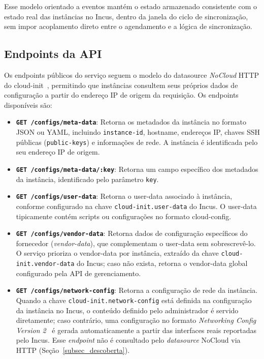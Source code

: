 Esse modelo orientado a eventos mantém o estado armazenado consistente com o estado real das instâncias no Incus, dentro da janela do ciclo de sincronização, sem impor acoplamento direto entre o agendamento e a lógica de sincronização.

\subsection{Endpoints da API}
\label{subsec_endpoints}

Os endpoints públicos do serviço seguem o modelo do datasource \textit{NoCloud} HTTP do cloud-init~\citep{cloudinit_nocloud}, permitindo que instâncias consultem seus próprios dados de configuração a partir do endereço IP de origem da requisição. Os endpoints disponíveis são:

\begin{itemize}
    \item \textbf{\texttt{GET /configs/meta-data}}: Retorna os metadados da instância no formato JSON ou YAML, incluindo \texttt{instance-id}, hostname, endereços IP, chaves SSH públicas (\texttt{public-keys}) e informações de rede. A instância é identificada pelo seu endereço IP de origem.

    \item \textbf{\texttt{GET /configs/meta-data/:key}}: Retorna um campo específico dos metadados da instância, identificado pelo parâmetro \texttt{key}.

    \item \textbf{\texttt{GET /configs/user-data}}: Retorna o user-data associado à instância, conforme configurado na chave \texttt{cloud-init.user-data} do Incus. O user-data tipicamente contém scripts ou configurações no formato cloud-config.

    \item \textbf{\texttt{GET /configs/vendor-data}}: Retorna dados de configuração específicos do fornecedor (\textit{vendor-data}), que complementam o user-data sem sobrescrevê-lo. O serviço prioriza o vendor-data por instância, extraído da chave \texttt{cloud-init.vendor-data} do Incus; caso não exista, retorna o vendor-data global configurado pela API de gerenciamento.

    \item \textbf{\texttt{GET /configs/network-config}}: Retorna a configuração de rede da instância. Quando a chave \texttt{cloud-init.network-config} está definida na configuração da instância no Incus, o conteúdo definido pelo administrador é servido diretamente; caso contrário, uma configuração no formato \textit{Networking Config Version 2}~\citep{cloudinit_netv2} é gerada automaticamente a partir das interfaces reais reportadas pelo Incus. Esse \textit{endpoint} não é consultado pelo \textit{datasource} NoCloud via HTTP (Seção~\ref{subsec_descoberta}).
\end{itemize}

